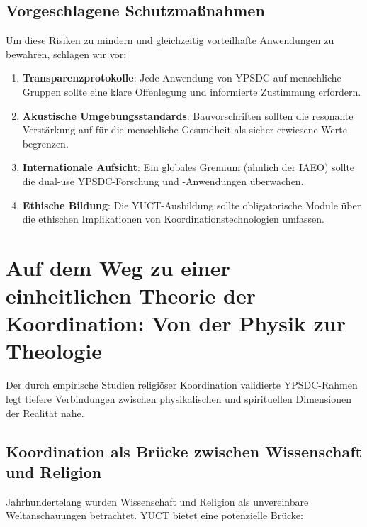 \documentclass[12pt,a4paper]{article}
\begin{document}
	\subsection{Vorgeschlagene Schutzmaßnahmen}
	
	Um diese Risiken zu mindern und gleichzeitig vorteilhafte Anwendungen zu bewahren, schlagen wir vor:
	
	\begin{enumerate}
		\item \textbf{Transparenzprotokolle}: Jede Anwendung von YPSDC auf menschliche Gruppen sollte eine klare Offenlegung und informierte Zustimmung erfordern.
		
		\item \textbf{Akustische Umgebungsstandards}: Bauvorschriften sollten die resonante Verstärkung auf für die menschliche Gesundheit als sicher erwiesene Werte begrenzen.
		
		\item \textbf{Internationale Aufsicht}: Ein globales Gremium (ähnlich der IAEO) sollte die dual-use YPSDC-Forschung und -Anwendungen überwachen.
		
		\item \textbf{Ethische Bildung}: Die YUCT-Ausbildung sollte obligatorische Module über die ethischen Implikationen von Koordinationstechnologien umfassen.
	\end{enumerate}
	
	\section{Auf dem Weg zu einer einheitlichen Theorie der Koordination: Von der Physik zur Theologie}
	\label{sec:philosophy}
	
	Der durch empirische Studien religiöser Koordination validierte YPSDC-Rahmen legt tiefere Verbindungen zwischen physikalischen und spirituellen Dimensionen der Realität nahe.
	
	\subsection{Koordination als Brücke zwischen Wissenschaft und Religion}
	
	Jahrhundertelang wurden Wissenschaft und Religion als unvereinbare Weltanschauungen betrachtet. YUCT bietet eine potenzielle Brücke:
	
\end{document}

